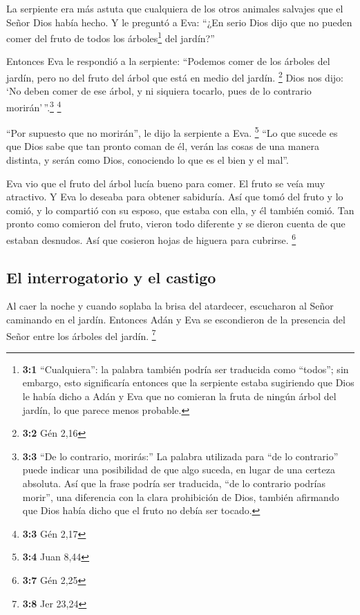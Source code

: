  La serpiente era más astuta que cualquiera de los otros
animales salvajes que el Señor Dios había hecho. Y le preguntó a Eva:
``¿En serio Dios dijo que no pueden comer del fruto de todos los
árboles\footnote{\textbf{3:1} ``Cualquiera'': la palabra también podría
  ser traducida como ``todos''; sin embargo, esto significaría entonces
  que la serpiente estaba sugiriendo que Dios le había dicho a Adán y
  Eva que no comieran la fruta de ningún árbol del jardín, lo que parece
  menos probable.} del jardín?''

 Entonces Eva le respondió a la serpiente: ``Podemos comer
de los árboles del jardín, pero no del fruto del árbol que está en medio
del jardín. \footnote{\textbf{3:2} Gén 2,16}  Dios nos
dijo: `No deben comer de ese árbol, y ni siquiera tocarlo, pues de lo
contrario morirán'\,''.\footnote{\textbf{3:3} ``De lo contrario,
  morirás:'' La palabra utilizada para ``de lo contrario'' puede indicar
  una posibilidad de que algo suceda, en lugar de una certeza absoluta.
  Así que la frase podría ser traducida, ``de lo contrario podrías
  morir'', una diferencia con la clara prohibición de Dios, también
  afirmando que Dios había dicho que el fruto no debía ser tocado.}
\footnote{\textbf{3:3} Gén 2,17}

 ``Por supuesto que no morirán'', le dijo la serpiente a
Eva. \footnote{\textbf{3:4} Juan 8,44}  ``Lo que sucede es
que Dios sabe que tan pronto coman de él, verán las cosas de una manera
distinta, y serán como Dios, conociendo lo que es el bien y el mal''.

 Eva vio que el fruto del árbol lucía bueno para comer. El
fruto se veía muy atractivo. Y Eva lo deseaba para obtener sabiduría.
Así que tomó del fruto y lo comió, y lo compartió con su esposo, que
estaba con ella, y él también comió.  Tan pronto como
comieron del fruto, vieron todo diferente y se dieron cuenta de que
estaban desnudos. Así que cosieron hojas de higuera para cubrirse.
\footnote{\textbf{3:7} Gén 2,25}

\hypertarget{el-interrogatorio-y-el-castigo}{%
\subsection{El interrogatorio y el
castigo}\label{el-interrogatorio-y-el-castigo}}

 Al caer la noche y cuando soplaba la brisa del atardecer,
escucharon al Señor caminando en el jardín. Entonces Adán y Eva se
escondieron de la presencia del Señor entre los árboles del jardín.
\footnote{\textbf{3:8} Jer 23,24}

